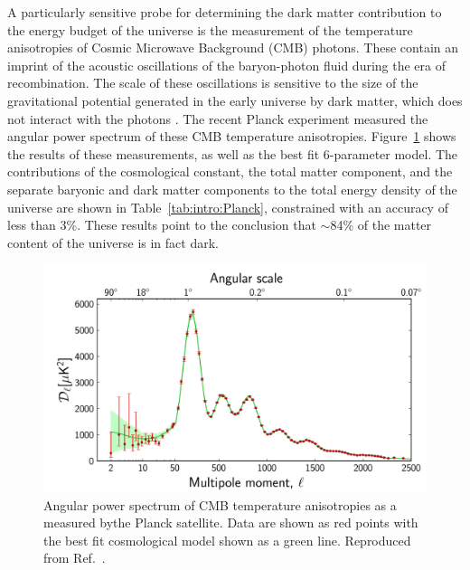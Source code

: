 


A particularly sensitive probe for determining the dark matter contribution to the energy budget of the universe is the measurement of the temperature anisotropies of Cosmic Microwave Background (CMB) photons. These contain an imprint of the acoustic oscillations of the baryon-photon fluid during the era of recombination. The scale of these oscillations is sensitive to the size of the gravitational potential generated in the early universe by dark matter, which does not interact with the photons \cite{Kolb:1990}. The recent Planck experiment \cite{PlanckI:2013} measured the angular power spectrum of these CMB temperature anisotropies. Figure~\ref{fig:intro:CMB} shows the results of these measurements, as well as the best fit 6-parameter \LCDM model. The contributions of the cosmological constant, the total matter component, and the separate baryonic and dark matter components to the total energy density of the universe are shown in Table~\ref{tab:intro:Planck}, constrained with an accuracy of less than 3\%. These results point to the conclusion that $\sim$84\% of the matter content of the universe is in fact dark.


\begin{figure}[h]

  \includegraphics[width=\textwidth]{CMBanisotropies.jpg}
  \caption[CMB anisotropies measured by the Planck experiment]{Angular power spectrum of CMB temperature anisotropies as a measured bythe Planck satellite. Data are shown as red points with the best fit \LCDM cosmological model shown as a green line. Reproduced from Ref.~\cite{PlanckI:2013}.}
  \label{fig:intro:CMB}
\end{figure}


